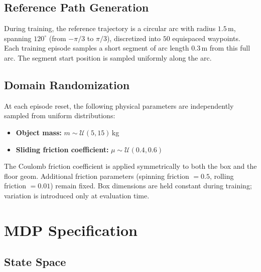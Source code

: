 \subsection{Reference Path Generation}

During training, the reference trajectory is a circular arc with radius $1.5$\,m, spanning $120^\circ$ (from $-\pi/3$ to $\pi/3$), discretized into $50$ equispaced waypoints.
Each training episode samples a short segment of arc length $0.3$\,m from this full arc.
The segment start position is sampled uniformly along the arc.

\subsection{Domain Randomization}

At each episode reset, the following physical parameters are independently sampled from uniform distributions:

\begin{itemize}
    \item \textbf{Object mass:} $m \sim \mathcal{U}(5, 15)$\,kg
    \item \textbf{Sliding friction coefficient:} $\mu \sim \mathcal{U}(0.4, 0.6)$
\end{itemize}

\noindent
The Coulomb friction coefficient is applied symmetrically to both the box and the floor geom.
Additional friction parameters (spinning friction $= 0.5$, rolling friction $= 0.01$) remain fixed.
Box dimensions are held constant during training; variation is introduced only at evaluation time.


\section{MDP Specification}\label{app:mdp}

\subsection{State Space}

